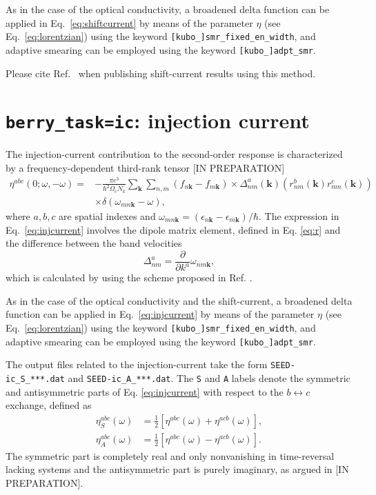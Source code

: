 As in the case of the optical conductivity, a broadened delta function can be 
applied in Eq.~\ref{eq:shiftcurrent} by means of the parameter
$\eta$ (see Eq.~\ref{eq:lorentzian}) using the keyword 
{\tt[kubo\_]smr\_fixed\_en\_width}, and adaptive smearing can 
be employed using the keyword {\tt [kubo\_]adpt\_smr}. 

Please cite Ref.~\cite{ibanez-azpiroz_ab_2018} when publishing shift-current results using this method.

\section{{\tt berry\_task=ic}: injection current}

The injection-current contribution to the second-order response
is characterized by a frequency-dependent third-rank tensor [IN PREPARATION]
\begin{equation}\label{eq:injcurrent}
\begin{split}
\eta^{abc}(0;\omega,-\omega)=&-\frac{\pi e^3}{\hbar^2 \Omega_c N_k}
\sum_{\bm{k}} \sum_{n,m}(f_{n\bm{k}}-f_{m\bm{k}})
\times
\Delta^a_{nm}(\bm{k})\left(r^b_{ nm}(\bm{k})r^c_{mn}(\bm{k})\right)\\
&\times \delta(\omega_{mn\bm{k}}-\omega),
\end{split}
\end{equation}
where $a,b,c$ are spatial indexes
and $\omega_{mn\bm{k}}=(\epsilon_{n\bm{k}}-\epsilon_{m\bm{k}})/\hbar$.
The expression in Eq.~\ref{eq:injcurrent} involves 
the dipole matrix element, defined in Eq. \eqref{eq:r}
and the difference between the band velocities
\begin{equation}
	\label{eq:delta}
	\Delta^a_{nm} = \frac{\partial}{\partial k^a} \omega_{nm\bm{k}},
\end{equation}
which is calculated by using the scheme proposed in Ref. \cite{yates-prb07}.

As in the case of the optical conductivity and the shift-current, a broadened delta function can be 
applied in Eq.~\ref{eq:injcurrent} by means of the parameter
$\eta$ (see Eq.~\ref{eq:lorentzian}) using the keyword 
{\tt[kubo\_]smr\_fixed\_en\_width}, and adaptive smearing can 
be employed using the keyword {\tt [kubo\_]adpt\_smr}. 

The output files related to the injection-current take the form \verb|SEED-ic_S_***.dat| and \verb|SEED-ic_A_***.dat|. 
The \verb|S| and \verb|A| labels denote the symmetric and antisymmetric parts of Eq. \eqref{eq:injcurrent} with respect to the $b\leftrightarrow c$ exchange, defined as
\begin{subequations}
	\label{eq:inj_sym_asym_components}
	\begin{align}
	\eta^{abc}_S(\omega) & = \frac{1}{2}\left[\eta^{abc}(\omega) + \eta^{acb}(\omega)\right],\label{eq:inj_sym}\\
	\eta^{abc}_A(\omega) & = \frac{1}{2}\left[\eta^{abc}(\omega) - \eta^{acb}(\omega)\right].\label{eq:inj_asym}
	\end{align}
\end{subequations}
The symmetric part is completely real and only nonvanishing in time-reversal lacking systems and the antisymmetric part is purely imaginary, as argued in [IN PREPARATION].

